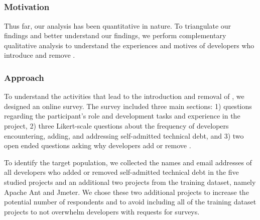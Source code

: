 \subsection*{\rqiv}

\subsubsection*{Motivation} 
Thus far, our analysis has been quantitative in nature. To triangulate our findings and better understand our findings, we perform complementary qualitative analysis to understand the experiences and motives of developers who introduce and remove \SATD.


 
\subsubsection*{Approach} 
To understand the activities that lead to the introduction and removal of \SATD, we designed an online survey. The survey included three main sections: 1)  questions regarding the participant's role and development tasks and experience in the project, 2) three Likert-scale questions about the frequency of developers encountering, adding, and addressing self-admitted technical debt, and 3) two open ended questions asking why developers add or remove \SATD. 

To identify the target population, we collected the names and email addresses of all developers who added or removed self-admitted technical debt in the five studied projects and an additional two projects from the training dataset, namely Apache Ant and Jmeter. We chose these two additional projects to increase the potential number of respondents and to avoid including all of the training dataset projects to not overwhelm developers with requests for surveys.

